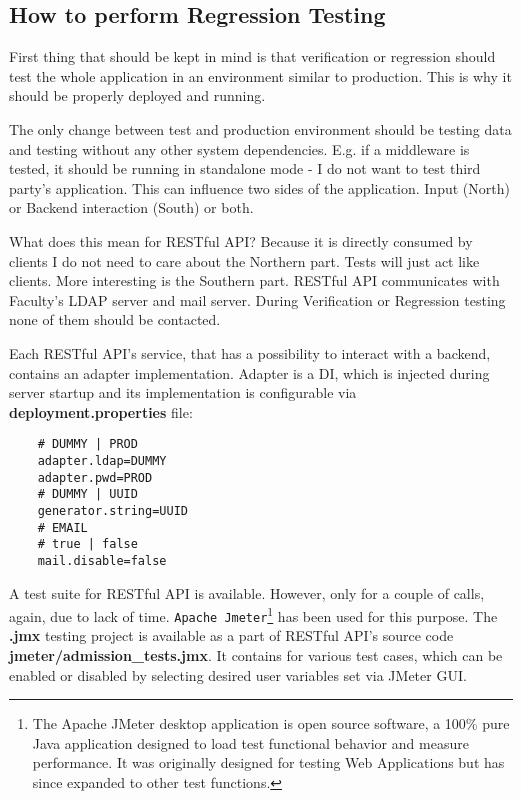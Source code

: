	\subsection{How to perform Regression Testing}
	
	First thing that should be kept in mind is that verification or regression should test the whole application in an
	environment similar to production. This is why it should be properly deployed and running.
	
	The only change between test and production environment should be testing data and testing without any other system
	dependencies. E.g. if a middleware is tested, it should be running in standalone mode - I do not want to test third
	party's application. This can influence two sides of the application. Input (North) or Backend interaction (South) or
	both.
	
	What does this mean for RESTful API? Because it is directly consumed by clients I do not need to care about the
	Northern part. Tests will just act like clients. More interesting is the Southern part. RESTful API communicates with
	Faculty's LDAP server and mail server. During Verification or Regression testing none of them should be contacted.
	
	Each RESTful API's service, that has a possibility to interact with a backend, contains an adapter implementation.
	Adapter is a \gls{DI}, which is injected during server startup and its implementation is configurable via
	\textbf{deployment.properties} file:
	
	\begin{verbatim}
	# DUMMY | PROD
	adapter.ldap=DUMMY
	adapter.pwd=PROD
	# DUMMY | UUID
	generator.string=UUID
	# EMAIL
	# true | false
	mail.disable=false
	\end{verbatim}
	
	A test suite for RESTful API is available. However, only for a couple of calls, again, due to lack of time.
	\verb|Apache Jmeter|\footnote{\cite{jmeter} The Apache JMeter\textsuperscript{\texttrademark} desktop application is open
	source software, a 100\% pure Java application designed to load test functional behavior and measure performance. It was
	originally designed for testing Web Applications but has since expanded to other test functions.} has been used for
	this purpose. The \textbf{.jmx} testing project is available as a part of RESTful API's source code
	\textbf{jmeter/admission\_tests.jmx}. It contains  for various test cases, which can be enabled or
	disabled by selecting desired user variables set via JMeter GUI.
	
